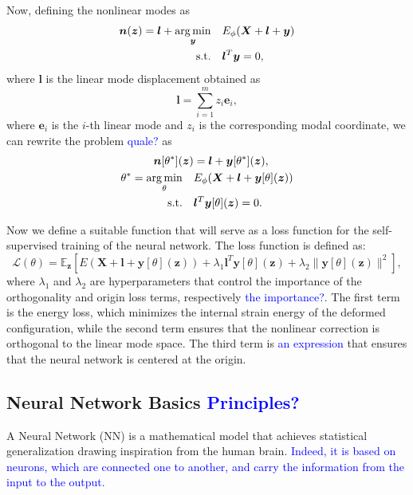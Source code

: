 Now, defining the nonlinear modes as 
\begin{align}
    \bm{n}(\bm{z}) = \bm{l} + \operatorname*{arg\,min}_{\bm{y}} \quad & E_\phi(\bm{X} + \bm{l} + \bm{y}) \\ 
    \text{s.t.} \quad & \bm{l}^T \bm{y} = 0,
\end{align}
where \( \bm{l} \) is the linear mode displacement obtained as
\begin{equation}
    \bm{l} = \sum_{i=1}^m z_i \bm{e}_i,
\end{equation}
where \( \bm{e}_i \) is the $i$-th linear mode and \( z_i \) is the corresponding modal coordinate, we can rewrite the problem \textcolor{blue}{quale?} as
\begin{align*}
    \bm{n}[\theta^*](\bm{z}) &= \bm{l} + \bm{y}[\theta^*](\bm{z}), \\
    \theta^* = \underset{\theta}{\operatorname*{arg\,min}} \quad & E_\phi(\bm{X} + \bm{l} + \bm{y}[\theta](\bm{z})) \\
    \text{s.t.} \quad & \bm{l}^T \bm{y}[\theta](\bm{z}) = 0.
\end{align*}

Now we define a suitable function that will serve as a loss function for the self-supervised training of the neural network. The loss function is defined as:
\begin{equation}
    \mathcal{L}(\theta) = \mathbb{E}_{\bm{z}} \left[ E(\bm{X} + \bm{l} + \bm{y}[\theta](\bm{z})) + \lambda_1 \bm{l}^T \bm{y}[\theta](\bm{z}) + \lambda_2 \|\bm{y}[\theta](\bm{z})\|^2 \right],
\end{equation}
where \( \lambda_1 \) and \( \lambda_2 \) are hyperparameters that control the importance of the orthogonality and origin loss terms, respectively\textcolor{blue}{ the importance?}. The first term is the energy loss, which minimizes the internal strain energy of the deformed configuration, while the second term ensures that the nonlinear correction is orthogonal to the linear mode space. The third term is \textcolor{blue}{an expression} that ensures that the neural network is centered at the origin.


\subsection{Neural Network Basics \textcolor{blue}{Principles?}}

A Neural Network (NN) is a mathematical model that achieves statistical generalization drawing inspiration from the human brain. \textcolor{blue}{Indeed, it is based on neurons, which are connected one to another, and carry the information from the input to the output.} 

